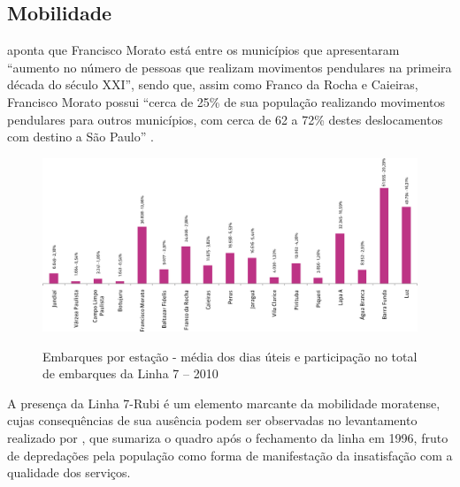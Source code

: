 	\subsection{Mobilidade} \label{Mobilidade}
	
	 aponta que Francisco Morato está entre os municípios que apresentaram ``aumento no número de
	pessoas que realizam movimentos pendulares na primeira década do século XXI'', sendo que, assim como Franco da Rocha e Caieiras, Francisco Morato possui ``cerca de 25\% de sua população realizando movimentos pendulares para outros municípios, com cerca de 62 a 72\% destes deslocamentos com destino a São Paulo'' \cite[p.72]{suarez2014a}.
	
	\begin{figure}[!htb]
		\centering
		\caption[Embarques por estação da Linha 7 - 2010]{Embarques por estação - média dos dias úteis e participação no total de embarques da Linha 7 – 2010}
		\includegraphics[width=\linewidth]{img/pdcptm_57a}
		\label{fig:pdcptm_57a}
	\end{figure}
    
    A presença da Linha 7-Rubi é um elemento marcante da mobilidade moratense, cujas consequências de sua ausência podem ser observadas no levantamento realizado por \cite[p.32-33]{ferreira2010a}, que sumariza o quadro após o fechamento da linha em 1996, fruto de depredações pela população como forma de manifestação da insatisfação com a qualidade dos serviços.
    
